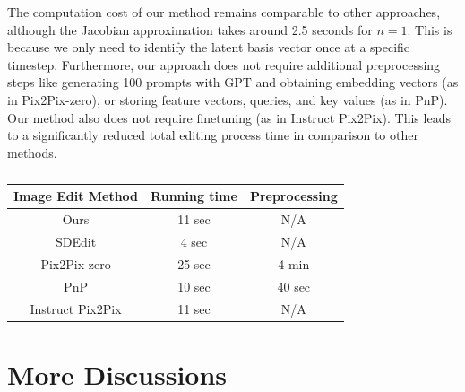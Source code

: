 The computation cost of our method remains comparable to other approaches, although the Jacobian approximation takes around 2.5 seconds for $n=1$. This is because we only need to identify the latent basis vector once at a specific timestep. Furthermore, our approach does not require additional preprocessing steps like generating 100 prompts with GPT and obtaining embedding vectors (as in Pix2Pix-zero), or storing feature vectors, queries, and key values (as in PnP). Our method also does not require finetuning (as in Instruct Pix2Pix). This leads to a significantly reduced total editing process time in comparison to other methods.

\begin{table}[t]
\caption{}
\begin{center}
\begin{small}
\begin{tabular}{c|c|c}
\toprule
 Image Edit Method & Running time & Preprocessing \\
\midrule
Ours             &     11 sec    & N/A            \\
SDEdit           &      4 sec    & N/A            \\
Pix2Pix-zero     &     25 sec    & 4 min          \\
PnP              &     10 sec    & 40 sec         \\
Instruct Pix2Pix &     11 sec    & N/A            \\
\bottomrule
\end{tabular}
\end{small}
\end{center}
\label{tab:comparison_time}
\end{table}


\section{More Discussions}


